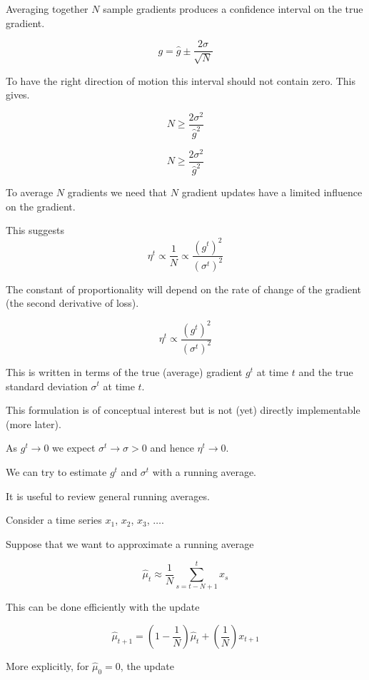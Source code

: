 {\vfill
Averaging together $N$ sample gradients produces a confidence interval on the true gradient.

$$g = \hat{g} \pm \frac{2\sigma}{\sqrt{N}}$$

To have the right direction of motion this interval should not contain zero.  This gives.

$$N \geq \frac{2\sigma^2}{\hat{g}^2}$$


$$N \geq \frac{2\sigma^2}{\hat{g}^2}$$

\vfill
To average $N$ gradients we need that $N$ gradient updates have a limited influence on the gradient.  

\vfill
This suggests
$$\eta^t \propto \frac{1}{N} \propto \frac{(g^t)^2}{(\sigma^t)^2}$$

\vfill
The constant of proportionality will depend on the rate of change of the gradient (the second derivative of loss).


$$\eta^t \propto \frac{(g^t)^2}{(\sigma^t)^2}$$

\vfill
This is written in terms of the true (average) gradient $g^t$ at time $t$ and the true standard deviation $\sigma^t$ at time $t$.

\vfill
This formulation is of conceptual interest but is not (yet) directly implementable (more later).

\vfill
As $g^t \rightarrow 0$ we expect $\sigma^t \rightarrow \sigma > 0$ and hence $\eta^t \rightarrow 0$.



We can try to estimate $g^t$ and $\sigma^t$ with a running average.

\vfill
It is useful to review general running averages.

\vfill
Consider a time series $x_1$, $x_2$, $x_3$, $\ldots$.

\vfill
Suppose that we want to approximate a running average

$$\hat{\mu}_{t} \approx \frac{1}{N} \sum_{s=t-N+1}^t x_s$$

\vfill
This can be done efficiently with the update

\vfill
$$\hat{\mu}_{t+1} = \left(1-\frac{1}{N}\right)\hat{\mu}_t + \left(\frac{1}{N}\right)x_{t+1}$$


More explicitly, for $\hat{\mu}_0 = 0$, the update

}

